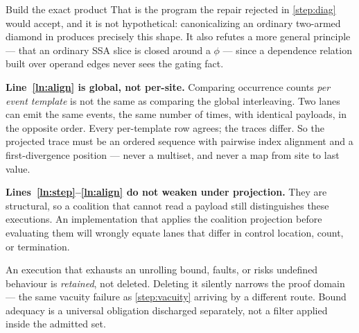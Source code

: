 \begin{step}{Build the exact product}{%
}
That is the program the repair rejected in \cref{step:diag} would accept, and it
is not hypothetical: canonicalizing an ordinary two-armed diamond in
 produces precisely this shape. It also refutes a more general
principle --- that an ordinary SSA slice is closed around a $\phi$ --- since a
dependence relation built over operand edges never sees the gating fact.

\textbf{Line~\ref{ln:align} is global, not per-site.} Comparing occurrence counts
\emph{per event template} is not the same as comparing the global interleaving.
Two lanes can emit the same events, the same number of times, with identical
payloads, in the opposite order. Every per-template row agrees; the traces
differ. So the projected trace must be an ordered sequence with pairwise index
alignment and a first-divergence position --- never a multiset, and never a
map from site to last value.

\textbf{Lines~\ref{ln:step}--\ref{ln:align} do not weaken under projection.}
They are structural, so a coalition that cannot read a payload still
distinguishes these executions. An implementation that applies the coalition
projection before evaluating them will wrongly equate lanes that differ in
control location, count, or termination.

\begin{remark}
An execution that exhausts an unrolling bound, faults, or risks undefined
behaviour is \emph{retained}, not deleted. Deleting it silently narrows the proof
domain --- the same vacuity failure as \cref{step:vacuity} arriving by a
different route. Bound adequacy is a universal obligation discharged separately,
not a filter applied inside the admitted set.
\end{remark}
\end{step}

